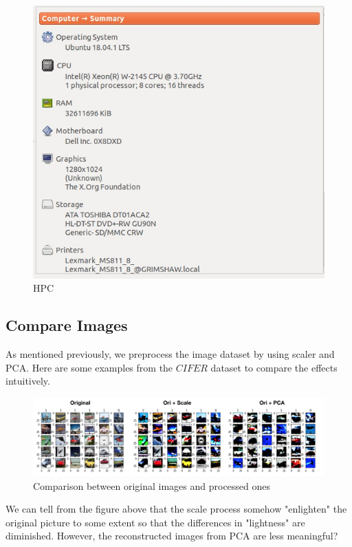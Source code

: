 \documentclass[12pt]{article} %
\begin{document}
\begin{figure}[tbh]
    \centering
	\includegraphics[scale=.7]{hpc}
	\caption{HPC}
	\label{fig:HPC}
\end{figure}

\subsection{Compare Images}
As mentioned previously, we preprocess the image dataset by using scaler and PCA. Here are some examples from the $CIFER$ dataset to compare the effects intuitively.

\begin{figure}[tbh] 
    \centering
	\includegraphics[scale=.35]{assignment2/image_compare.png}
	\caption{Comparison between original images and processed ones}
	\label{fig:Compare_Image}
\end{figure}

We can tell from the figure above that the scale process somehow "enlighten" the original picture to some extent so that the differences in "lightness" are diminished. 
{\color{red} However, the reconstructed images from PCA are less meaningful? }
\end{document}
